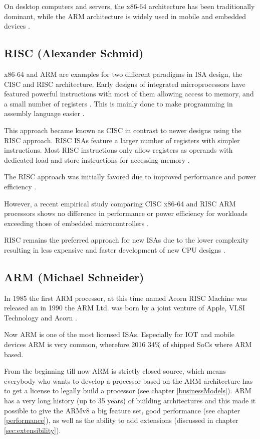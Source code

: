 \documentclass[conference]{IEEEtran}
\begin{document}
	On desktop computers and servers, the x86-64 architecture has been traditionally dominant,
	while the ARM architecture is widely used in mobile and embedded devices \cite{Blem2013}.

	\subsection{RISC (Alexander Schmid)}
	x86-64 and ARM are examples for two different paradigms in \gls{ISA} design, the \gls{CISC} and \gls{RISC} architecture.
	Early designs of integrated microprocessors have featured powerful instructions with most of them allowing access to memory,
	and a small number of registers \cite{George1990}. This is mainly done to make programming in assembly language easier \cite[page 73]{Stokes2006}.

	This approach became known as \gls{CISC} in contrast to newer designs using the \gls{RISC} approach.
	\gls{RISC} \glspl{ISA} feature a larger number of registers with simpler instructions.
	Most \gls{RISC} instructions only allow registers as operands with dedicated load and store instructions for accessing memory \cite{George1990}.

	The \gls{RISC} approach was initially favored due to improved performance and power efficiency \cite{George1990}.
	
	However, a recent empirical study comparing \gls{CISC} x86-64 and \gls{RISC} ARM processors shows no difference in performance or power efficiency
	for workloads exceeding those of embedded microcontrollers \cite{Blem2013}.

	\gls{RISC} remains the preferred approach for new \glspl{ISA} due to the lower complexity resulting in less expensive and faster
	development of new CPU designs \cite{George1990}. 

	\subsection{ARM (Michael Schneider)}
	In 1985 the first ARM processor, at this time named Acorn RISC Machine was released an in 1990 the ARM Ltd. was born by a joint venture of Apple, VLSI Technology and Acorn \cite{Levy2005}.

	 Now ARM is one of the most licensed \glspl{ISA}. Especially for IOT and mobile devices ARM is very common, wherefore 2016 34\% of shipped SoCs where ARM based. \cite[slide 7-10]{Holdings2018}

	From the beginning till now ARM is strictly closed source, which means everybody who wants to develop a processor based on the ARM architecture has to get a license to legally build a processor (see chapter \ref{businessModels}). ARM has a very long history (up to 35 years) of building architectures and this made it possible to give the ARMv8 a big feature set, good performance (see chapter \ref{performance}), as well as the ability to add extensions (discussed in chapter \ref{sec:extensibility}).
	
\end{document}
